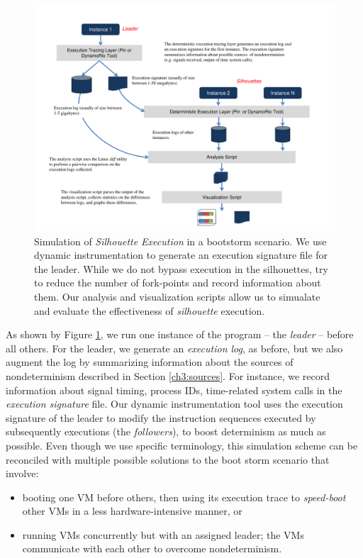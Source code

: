 \begin{figure}[]
  \center
  \includegraphics[scale=0.7, trim=1cm 0cm 1cm 0cm]
                  {simulation.pdf}
  \caption[Simulation of {\em Silhouette Execution} in a bootstorm scenario]%
  {Simulation of {\em Silhouette Execution} in a bootstorm scenario.
    We use dynamic instrumentation to 
    generate an execution signature file for the leader.
    While we do not bypass execution in the 
    silhouettes, try to reduce the number of fork-points 
    and record information about them.
    Our analysis and visualization
    scripts allow us to simualate and evaluate
    the effectiveness of {\em silhouette} execution.
  }
  \label{ch3:figsimulation}
\end{figure}





As shown by Figure \ref{ch3:figsimulation}, we run one instance of the
program -- the {\em leader} -- before all others.
For the leader, we generate an {\em execution log}, as before,
but we also augment the log by summarizing information about the sources of nondeterminism
described in Section \ref{ch3:sources}. For instance, we record
information about signal timing, process IDs, time-related system calls
in the {\em execution signature} file. Our dynamic instrumentation tool
uses the execution signature of the leader
to modify the instruction sequences executed by subsequently
executions (the {\em followers}), to boost determinism as much as possible.
Even though we use specific terminology, this simulation scheme can be
reconciled with multiple possible solutions to the 
boot storm scenario that involve:
\begin{itemize}
\item
booting one VM before others,
then using its execution trace to {\em speed-boot} other VMs
in a less hardware-intensive manner, or
\item 
running VMs concurrently but with an assigned leader;
the VMs communicate with each other to overcome
nondeterminism.
\end{itemize}


